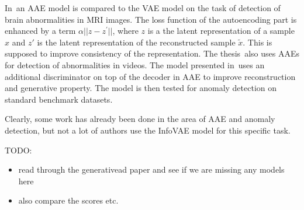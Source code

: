 In\,\cite{chen2018unsupervised} an AAE model is compared to the
VAE model on the task of detection of brain abnormalities in MRI images.
The loss function of the autoencoding part is enhanced by a term $\alpha||z-z^{\prime}||$,
where $z$ is a the latent representation of a sample $x$ and $z'$
is the latent representation of the reconstructed sample $\tilde{x}$.
This is supposed to improve consistency of the representation. The
thesis\,\cite{dimokranitou2017adversarial} also uses AAEs for detection
of abnormalities in videos. The model presented in\,\cite{pidhorskyi2018generative}
uses an additional discriminator on top of the decoder in AAE to improve
reconstruction and generative property. The model is then tested for
anomaly detection on standard benchmark datasets.

Clearly, some work has already been done in the area of AAE and anomaly
detection, but not a lot of authors use the InfoVAE model for this
specific task.


TODO:

\begin{itemize}
    \item read through the generativead paper and see if we are missing any models here
    \item also compare the scores etc.
\end{itemize}
